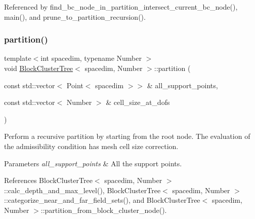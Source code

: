 Referenced by find\+\_\+bc\+\_\+node\+\_\+in\+\_\+partition\+\_\+intersect\+\_\+current\+\_\+bc\+\_\+node(), main(), and prune\+\_\+to\+\_\+partition\+\_\+recursion().

\mbox{\label{classBlockClusterTree_a075983197c805c6451aa00502dc30e76}} 
\subsubsection{\texorpdfstring{partition()}{partition()}\hspace{0.1cm}{\footnotesize\ttfamily [2/2]}}
{\footnotesize\ttfamily template$<$int spacedim, typename Number $>$ \\
void \hyperlink{classBlockClusterTree}{Block\+Cluster\+Tree}$<$ spacedim, Number $>$\+::partition (\begin{DoxyParamCaption}\item[{const std\+::vector$<$ Point$<$ spacedim $>$$>$ \&}]{all\+\_\+support\+\_\+points,  }\item[{const std\+::vector$<$ Number $>$ \&}]{cell\+\_\+size\+\_\+at\+\_\+dofs }\end{DoxyParamCaption})}

Perform a recursive partition by starting from the root node. The evaluation of the admissibility condition has mesh cell size correction.


\begin{DoxyParams}{Parameters}
{\em all\+\_\+support\+\_\+points} & All the support points. \\
\hline
\end{DoxyParams}


References Block\+Cluster\+Tree$<$ spacedim, Number $>$\+::calc\+\_\+depth\+\_\+and\+\_\+max\+\_\+level(), Block\+Cluster\+Tree$<$ spacedim, Number $>$\+::categorize\+\_\+near\+\_\+and\+\_\+far\+\_\+field\+\_\+sets(), and Block\+Cluster\+Tree$<$ spacedim, Number $>$\+::partition\+\_\+from\+\_\+block\+\_\+cluster\+\_\+node().

\mbox{\label{classBlockClusterTree_a0e40b3884535eae57d00c078ec782459}} 
